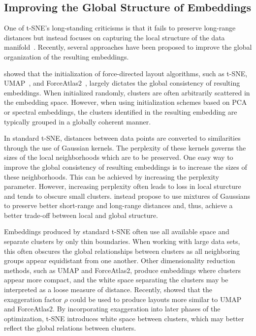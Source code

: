 \documentclass[article]{jss}
\begin{document}
\subsection{Improving the Global Structure of Embeddings} \label{sec:meth.global}

One of t-SNE's long-standing criticisms is that it fails to preserve long-range
distances but instead focuses on capturing the local structure of the data
manifold~\citep{becht2019dimensionality}. Recently, several approaches have been
proposed to improve the global organization of the resulting embeddings.

\citet{kobak2019umap} showed that the initialization of force-directed layout
algorithms, such as t-SNE, UMAP~\citep{2018arXivUMAP}, and
ForceAtlas2~\citep{jacomy2014forceatlas2}, largely dictates the global
consistency of resulting embeddings. When initialized randomly, clusters are
often arbitrarily scattered in the embedding space. However, when using
initialization schemes based on PCA or spectral embeddings, the clusters
identified in the resulting embedding are typically grouped in a globally
coherent manner.

In standard t-SNE, distances between data points are converted to similarities
through the use of Gaussian kernels. The perplexity of these kernels governs the
sizes of the local neighborhoods which are to be preserved. One easy way to
improve the global consistency of resulting embeddings is to increase the sizes
of these neighborhoods. This can be achieved by increasing the perplexity
parameter. However, increasing perplexity often leads to loss in local sturcture
and tends to obscure small clusters. \citet{kobak2019art} instead propose to use
mixtures of Gaussians to preserve better short-range and long-range distances
and, thus, achieve a better trade-off between local and global structure.

Embeddings produced by standard t-SNE often use all available space and separate
clusters by only thin boundaries. When working with large data sets, this often
obscures the global relationships between clusters as all neighboring groups
appear equidistant from one another.  Other dimensionality reduction methods,
such as UMAP and ForceAtlas2, produce embeddings where clusters appear more
compact, and the white space separating the clusters may be interpreted as a
loose measure of distance. Recently, \citet{bohm2020unifying} showed that the
exaggeration factor $\rho$ could be used to produce layouts more similar to UMAP
and ForceAtlas2. By incorporating exaggeration into later phases of the
optimization, t-SNE introduces white space between clusters, which may better
reflect the global relations between clusters.
\end{document}
